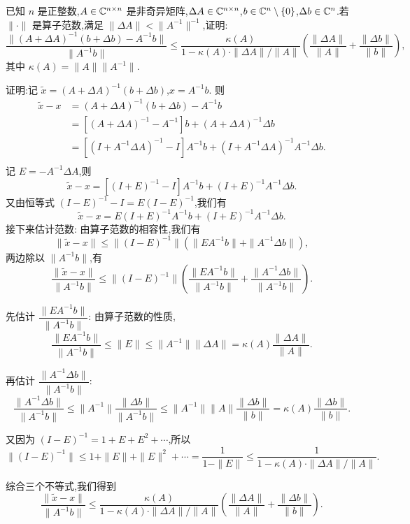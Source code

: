 \begin{problem}
已知 $n$ 是正整数,$A\in\mathbb{C}^{n\times n}$ 是非奇异矩阵,$\Delta A\in\mathbb{C}^{n\times n}$,$b\in\mathbb{C}^n\setminus\{0\}$,$\Delta b\in\mathbb{C}^n$.若 $\|\cdot\|$ 是算子范数,满足 $\|\Delta A\|<\|A^{-1}\|^{-1}$,证明:
\[
    \frac{\|(A+\Delta A)^{-1}(b+\Delta b)-A^{-1}b\|}{\|A^{-1}b\|}
    \le
    \frac{\kappa(A)}{1-\kappa(A)\cdot\|\Delta A\|/\|A\|}
    \left(
        \frac{\|\Delta A\|}{\|A\|}
        +
        \frac{\|\Delta b\|}{\|b\|}
    \right),
\]
其中 $\kappa(A)=\|A\|\|A^{-1}\|$.
\begin{solution}
    证明:记 $\tilde{x} = (A+\Delta A)^{-1}(b+\Delta b)$,$x = A^{-1}b$. 则
    \begin{align*}
        \tilde{x} - x
        &= (A+\Delta A)^{-1}(b+\Delta b) - A^{-1}b \\
        &= [(A+\Delta A)^{-1} - A^{-1}]b + (A+\Delta A)^{-1}\Delta b \\
        &= [(I + A^{-1}\Delta A)^{-1} - I]A^{-1}b + (I+A^{-1}\Delta A)^{-1}A^{-1}\Delta b. \\
    \end{align*}
    记 $E = -A^{-1}\Delta A$,则
    \[
        \tilde{x} - x = [(I + E)^{-1} - I]A^{-1}b + (I+E)^{-1}A^{-1}\Delta b.
    \]
    又由恒等式 $(I - E)^{-1} - I = E(I - E)^{-1}$,我们有
    \[
        \tilde{x} - x = E(I + E)^{-1}A^{-1}b + (I+E)^{-1}A^{-1}\Delta b.
    \]
    接下来估计范数:
    由算子范数的相容性,我们有
    \[
        \|\tilde{x} - x\| \le \|(I - E)^{-1}\|(\|EA^{-1}b\| + \|A^{-1}\Delta b\|),
    \]
    两边除以 $\|A^{-1}b\|$,有
    \[
        \frac{\|\tilde x-x\|}{\|A^{-1}b\|} \le \|(I-E)^{-1}\| \left( \frac{\|EA^{-1}b\|}{\|A^{-1}b\|} + \frac{\|A^{-1}\Delta b\|}{\|A^{-1}b\|} \right).
    \]

    先估计 $\dfrac{\|EA^{-1}b\|}{\|A^{-1}b\|}$:
    由算子范数的性质,
    \[
        \frac{\|EA^{-1}b\|}{\|A^{-1}b\|} \le \|E\| \le \|A^{-1}\|\|\Delta A\| = \kappa(A)\frac{\|\Delta A\|}{\|A\|}.
    \]

    再估计 $\dfrac{\|A^{-1}\Delta b\|}{\|A^{-1}b\|}$:
    \[
        \frac{\|A^{-1}\Delta b\|}{\|A^{-1}b\|} \le \|A^{-1}\| \frac{\|\Delta b\|}{\|A^{-1}b\|} \le \|A^{-1}\|\|A\|\frac{\|\Delta b\|}{\|b\|} = \kappa(A)\frac{\|\Delta b\|}{\|b\|}.
    \]

    又因为 $(I-E)^{-1} = 1 + E + E^2 + \cdots$,所以
    \[
        \|(I-E)^{-1}\| \le 1+\|E\|+\|E\|^2 + \cdots = \frac{1}{1-\|E\|} \le \frac{1}{1-\kappa(A)\cdot\|\Delta A\|/\|A\|}.
    \]

    综合三个不等式,我们得到
    \[
        \frac{\|\tilde x-x\|}{\|A^{-1}b\|} \le \frac{\kappa(A)}{1-\kappa(A)\cdot\|\Delta A\|/\|A\|} \left( \frac{\|\Delta A\|}{\|A\|} + \frac{\|\Delta b\|}{\|b\|} \right).
    \]
\end{solution}
\end{problem}


